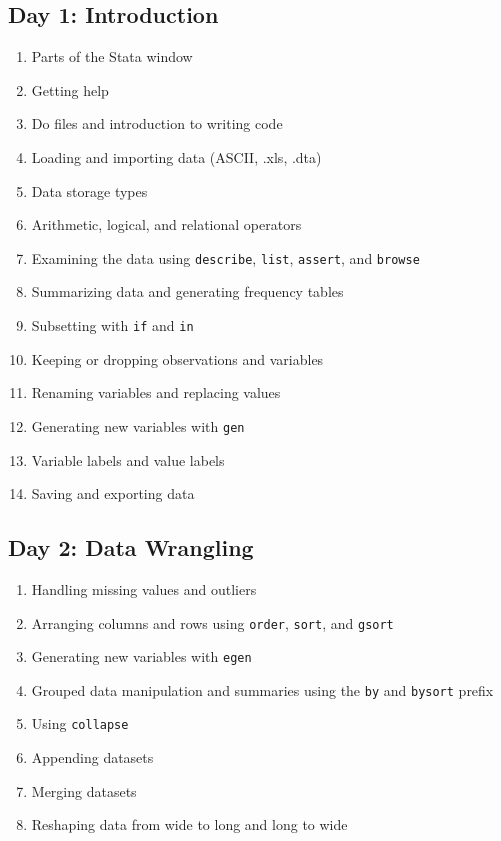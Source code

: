\documentclass[11pt]{article}
\begin{document}
\subsection*{Day 1: Introduction}
\begin{enumerate}
\setlength\itemsep{-0.5em}
\item Parts of the Stata window
\item Getting help
\item Do files and introduction to writing code
\item Loading and importing data (ASCII, .xls,  .dta)
\item Data storage types
\item Arithmetic, logical, and relational operators
\item Examining the data using \verb!describe!,  \verb!list!,  \verb!assert!, and \verb!browse!
\item Summarizing data and generating frequency tables
\item Subsetting with \verb!if! and \verb!in!
\item Keeping or dropping observations and variables
\item Renaming variables and replacing values
\item Generating new variables with \verb!gen!
\item Variable labels and value labels
\item Saving and exporting data


\end{enumerate}

\subsection*{Day 2: Data Wrangling}
\begin{enumerate}
\setlength\itemsep{-0.5em}
\item Handling missing values and outliers
\item Arranging columns and rows using \verb!order!,  \verb!sort!,  and \verb!gsort! 
\item Generating new variables with \verb!egen!
\item Grouped data manipulation and summaries using the \verb!by! and \verb!bysort! prefix
\item Using \verb!collapse!
\item Appending datasets
\item Merging datasets
\item Reshaping data from wide to long and long to wide
\end{enumerate}
\end{document}
